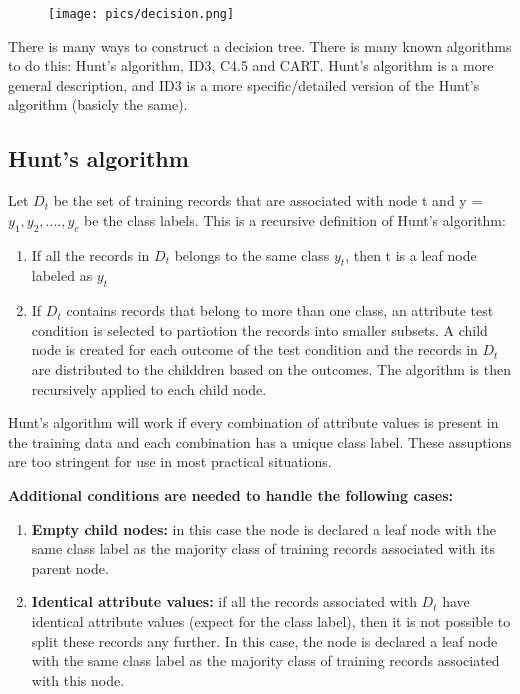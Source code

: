 		\begin{figure}[H]
			\centering
			\texttt{[image: pics/decision.png]}
		\end{figure}

		There is many ways to construct a decision tree. There is many known algorithms to
		do this: Hunt's algorithm, ID3, C4.5 and CART. 
		Hunt's algorithm is a more general description, and ID3 is a more specific/detailed
		version of the Hunt's algorithm (basicly the same).

\clearpage
		\subsection*{Hunt's algorithm} 
		Let $D_{t}$ be the set of training records that are 
		associated with node t and y = {$y_{1}, y_{2}, ...., y_{c}$} be the class labels. 
		This is a recursive definition of Hunt's algorithm:
		\begin{enumerate}
			\item If all the records in $D_{t}$ belongs to the same class $y_{t}$, then
			t is a leaf node labeled as $y_{t}$
			\item If $D_{t}$ contains records that belong to more than one class, an
			attribute test condition is selected to partiotion the records into smaller
			subsets. A child node is created for each outcome of the test condition and 
			the records in $D_{t}$ are distributed to the childdren based on the outcomes. 
			The algorithm is then recursively applied to each child node. 
		\end{enumerate} 

		Hunt's algorithm will work if every combination of attribute values is present
		in the training data and each combination has a unique class label. 
		These assuptions are too stringent for use in most practical situations.

		{\bf Additional conditions are needed to handle the following cases:}

		\begin{enumerate}
			\item {\bf Empty child nodes:} in this case the node is declared a leaf
			node with the same class label as the majority class of training records
			associated with its parent node. 
			\item{\bf Identical attribute values:} if all the records associated with
			$D_{t}$ have identical attribute values (expect for the class label), then
			it is not possible to split these records any further. In this case, the node is
			declared a leaf node with the same class label as the majority class of 
			training records associated with this node.
		\end{enumerate}


